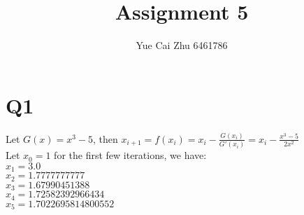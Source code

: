 \documentclass[]{article}
\title{Assignment 5}
\author{Yue Cai Zhu 6461786}
\begin{document}
\maketitle


\section{Q1}
Let $G(x) = x^3 - 5$, then $x_{i+1}=f(x_i)=x_i - \frac{G(x_i)}{G'(x_i)}=x_i - \frac{x^3-5}{2x^2}$\\
Let $x_0 = 1$ for the first few iterations, we have:\\
$x_1=3.0$\\
$x_2=1.7777777777$\\
$x_3=1.67990451388$\\
$x_4=1.72582392966434$\\
$x_5=1.7022695814800552$\\
\end{document}
